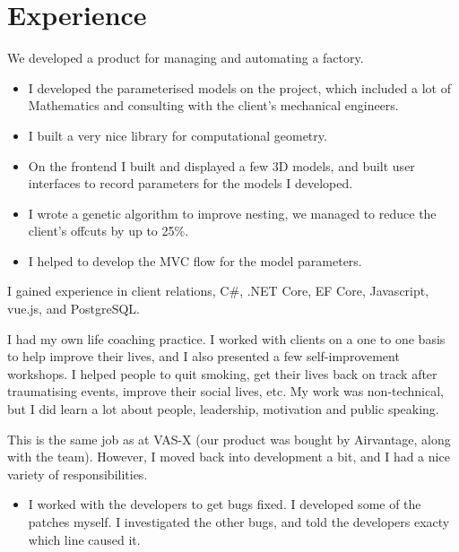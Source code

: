 \documentclass[a4paper]{twentysecondcv} %
\begin{document}

\section{Experience}

\begin{twenty} %
    {We developed a product for managing and automating a factory.
    \begin{itemize}
        \item I developed the parameterised models on the project, which included a lot of Mathematics and consulting with the client's mechanical engineers.
        \item I built a very nice library for computational geometry.
        \item On the frontend I built and displayed a few 3D models, and built user interfaces to record parameters for the models I developed.
        \item I wrote a genetic algorithm to improve nesting, we managed to reduce the client's offcuts by up to 25\%.
        \item I helped to develop the MVC flow for the model parameters.
    \end{itemize}
    I gained experience in client relations, C\#, .NET Core, EF Core, Javascript, vue.js, and PostgreSQL.}
    {I had my own life coaching practice. I worked with clients on a one to one basis to help improve their lives, and I also presented a few self-improvement workshops. I helped people to quit smoking, get their lives back on track after traumatising events, improve their social lives, etc. My work was non-technical, but I did learn a lot about people, leadership, motivation and public speaking.}
    {This is the same job as at VAS-X (our product was bought by Airvantage, along with the team). However, I moved back into development a bit, and I had a nice variety of responsibilities.
    \begin{itemize}
        \item I worked with the developers to get bugs fixed. I developed some of the patches myself. I investigated the other bugs, and told the developers exacty which line caused it.

\end{itemize}}
\end{twenty}
\end{document}
